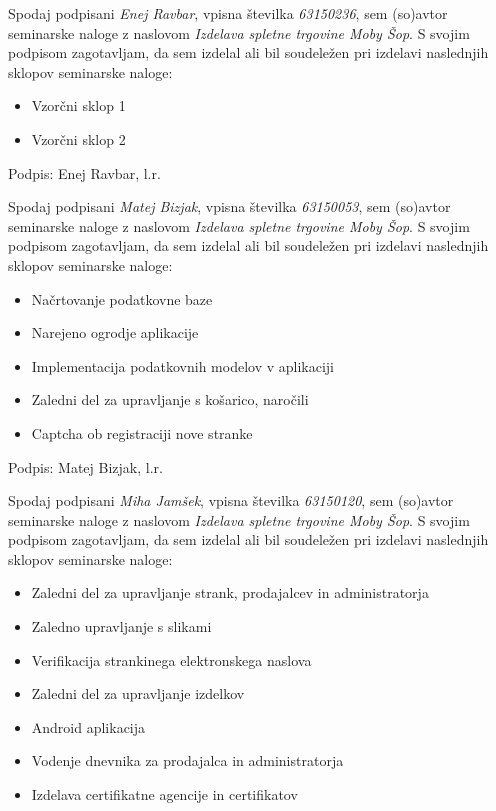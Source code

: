 \documentclass[a4paper,12pt]{report}
\newcommand{\naslov}     {Izdelava spletne trgovine Moby Šop}
\newcommand{\prviavtor}  {Enej Ravbar}
\newcommand{\prviindeks} {63150236}
\newcommand{\drugiavtor} {Matej Bizjak}
\newcommand{\drugiindeks}{63150053}
\newcommand{\tretjiavtor} {Miha Jamšek}
\newcommand{\tretjiindeks}{63150120}
\begin{document}
Spodaj podpisani \textit{\prviavtor}, vpisna številka \textit{\prviindeks}, sem (so)avtor seminarske naloge z naslovom \textit{\naslov}. S svojim podpisom zagotavljam, da sem izdelal ali bil soudeležen pri izdelavi naslednjih sklopov seminarske naloge:
\begin{itemize}
    \item Vzorčni sklop 1
	\item Vzorčni sklop 2
\end{itemize}

Podpis: {\prviavtor}, l.r.

\newpage

Spodaj podpisani \textit{\drugiavtor}, vpisna številka \textit{\drugiindeks}, sem (so)avtor seminarske naloge z naslovom \textit{\naslov}. S svojim podpisom zagotavljam, da sem izdelal ali bil soudeležen pri izdelavi naslednjih sklopov seminarske naloge:
\begin{itemize}
    \item Načrtovanje podatkovne baze
    \item Narejeno ogrodje aplikacije
    \item Implementacija podatkovnih modelov v aplikaciji
    \item Zaledni del za upravljanje s košarico, naročili
    \item Captcha ob registraciji nove stranke
\end{itemize}

Podpis: {\drugiavtor}, l.r.

\newpage

Spodaj podpisani \textit{\tretjiavtor}, vpisna številka \textit{\tretjiindeks}, sem (so)avtor seminarske naloge z naslovom \textit{\naslov}. S svojim podpisom zagotavljam, da sem izdelal ali bil soudeležen pri izdelavi naslednjih sklopov seminarske naloge:
\begin{itemize}
    \item Zaledni del za upravljanje strank, prodajalcev in administratorja
    \item Zaledno upravljanje s slikami
    \item Verifikacija strankinega elektronskega naslova
    \item Zaledni del za upravljanje izdelkov
    \item Android aplikacija
    \item Vodenje dnevnika za prodajalca in administratorja
    \item Izdelava certifikatne agencije in certifikatov
\end{itemize}
\end{document}
